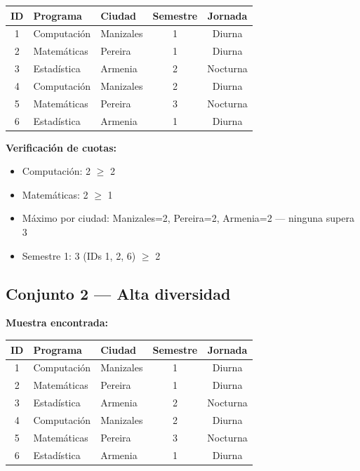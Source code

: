\documentclass[12pt, a4paper]{article}
\begin{document}
\begin{center}
\begin{tabular}{cllcc}
  \toprule
  \textbf{ID} & \textbf{Programa} & \textbf{Ciudad} & \textbf{Semestre} & \textbf{Jornada} \\
  \midrule
  \rowcolor{unalverde!15} 1 & Computación & Manizales & 1 & Diurna   \\
                           2 & Matemáticas & Pereira   & 1 & Diurna   \\
                           3 & Estadística & Armenia   & 2 & Nocturna \\
  \rowcolor{unalverde!15} 4 & Computación & Manizales & 2 & Diurna   \\
                           5 & Matemáticas & Pereira   & 3 & Nocturna \\
                           6 & Estadística & Armenia   & 1 & Diurna   \\
  \bottomrule
\end{tabular}
\end{center}

\textbf{Verificación de cuotas:}
\begin{itemize}[noitemsep]
  \item Computación: 2 $\geq$ 2 \checkmark
  \item Matemáticas: 2 $\geq$ 1 \checkmark
  \item Máximo por ciudad: Manizales=2, Pereira=2, Armenia=2 — ninguna supera 3 \checkmark
  \item Semestre 1: 3 (IDs 1, 2, 6) $\geq$ 2 \checkmark
\end{itemize}

\subsection{Conjunto 2 — Alta diversidad}

\textbf{Muestra encontrada:}

\begin{center}
\begin{tabular}{cllcc}
  \toprule
  \textbf{ID} & \textbf{Programa} & \textbf{Ciudad} & \textbf{Semestre} & \textbf{Jornada} \\
  \midrule
   1 & Computación & Manizales & 1 & Diurna   \\
   2 & Matemáticas & Pereira   & 1 & Diurna   \\
   3 & Estadística & Armenia   & 2 & Nocturna \\
   4 & Computación & Manizales & 2 & Diurna   \\
   5 & Matemáticas & Pereira   & 3 & Nocturna \\
   6 & Estadística & Armenia   & 1 & Diurna   \\
  \bottomrule
\end{tabular}
\end{center}
\end{document}
